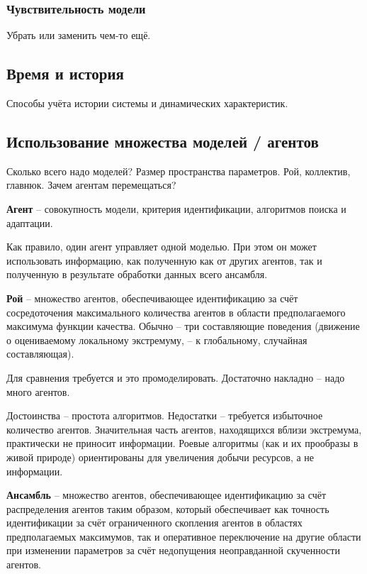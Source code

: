 \documentclass[a4paper,12pt]{article}
\newcommand{\Cmt}[1]{ {\small\color{red}#1} }
\begin{document}
\subsubsection{Чувствительность модели}

Убрать или заменить чем-то ещё.


\subsection{Время и история}

Способы учёта истории системы и динамических характеристик.

\subsection{ Использование множества моделей / агентов}

Сколько всего надо моделей? Размер пространства параметров.
Рой, коллектив, главнюк.
Зачем агентам перемещаться?

\textbf{ Агент } -- совокупность модели, критерия идентификации,
алгоритмов поиска и адаптации.

Как правило, один агент управляет одной моделью. При этом
он может использовать информацию, как полученную как от других
агентов, так и полученную в результате обработки данных
всего ансамбля.

\textbf{ Рой } -- множество агентов, обеспечивающее идентификацию за счёт
сосредоточения максимального количества агентов
в области предполагаемого максимума функции качества.
Обычно -- три составляющие поведения
(движение о оцениваемому локальному экстремуму, -- к глобальному, случайная составляющая).

\Cmt{Для сравнения требуется и это промоделировать.
Достаточно накладно -- надо много агентов.}

Достоинства -- простота алгоритмов.
Недостатки -- требуется избыточное количество агентов.
Значительная часть агентов, находящихся вблизи экстремума,
практически не приносит информации. Роевые
алгоритмы (как и их прообразы в живой природе) ориентированы
для увеличения добычи ресурсов, а не информации.

\textbf{ Ансамбль } -- множество агентов, обеспечивающее идентификацию за счёт
распределения агентов таким образом, который обеспечивает как
точность идентификации за счёт ограниченного скопления агентов
в областях предполагаемых максимумов, так и оперативное переключение
на другие области при изменении параметров за счёт недопущения
неоправданной скученности агентов.
\end{document}
